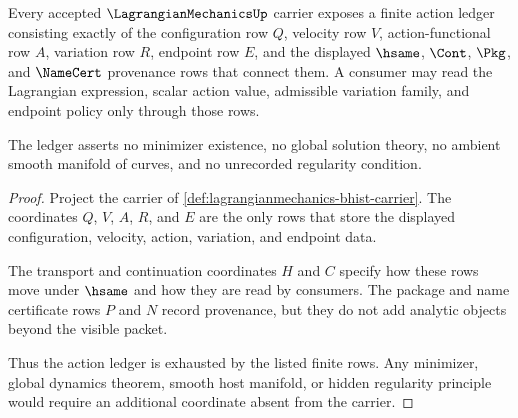 \begin{theorem}
\label{thm:lagrangianmechanics-action-ledger-obligation}
Every accepted $\LagrangianMechanicsUp$ carrier exposes a finite action ledger
consisting exactly of the configuration row $Q$, velocity row $V$,
action-functional row $A$, variation row $R$, endpoint row $E$, and the
displayed $\hsame$, $\Cont$, $\Pkg$, and $\NameCert$ provenance rows that
connect them. A consumer may read the Lagrangian expression, scalar action
value, admissible variation family, and endpoint policy only through those
rows.

The ledger asserts no minimizer existence, no global solution theory, no
ambient smooth manifold of curves, and no unrecorded regularity condition.
\end{theorem}
\begin{proof}
Project the carrier of
\autoref{def:lagrangianmechanics-bhist-carrier}. The coordinates $Q$, $V$,
$A$, $R$, and $E$ are the only rows that store the displayed configuration,
velocity, action, variation, and endpoint data.

The transport and continuation coordinates $H$ and $C$ specify how these rows
move under $\hsame$ and how they are read by consumers. The package and name
certificate rows $P$ and $N$ record provenance, but they do not add analytic
objects beyond the visible packet.

Thus the action ledger is exhausted by the listed finite rows. Any minimizer,
global dynamics theorem, smooth host manifold, or hidden regularity principle
would require an additional coordinate absent from the carrier.
\end{proof}

